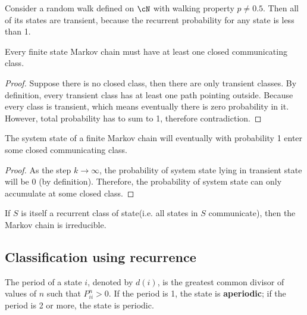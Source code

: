 \begin{refsection}
\begin{example}
Consider a random walk defined on $\cN$ with walking property $p\neq 0.5$. Then all of its states are transient, because the recurrent probability for any state is less than 1.\cite[70]{privault2013understanding} 
\end{example}


\begin{lemma}\cite[237]{luenberger1979introduction}
Every finite state Markov chain must have at least one closed communicating class.
\end{lemma}
\begin{proof}
Suppose there is no closed class, then there are only transient classes. By definition, every transient class has at least one path pointing outside. Because every class is transient, which means eventually there is zero probability in it. However, total probability has to sum to 1, therefore contradiction. 
\end{proof}



\begin{lemma}\cite[237]{luenberger1979introduction}
The system state of a finite Markov chain will eventually with probability 1 enter some closed communicating class.
\end{lemma}
\begin{proof}
As the step $k \to \infty$, the probability of system state lying in transient state will be 0 (by definition). Therefore, the probability of system state can only accumulate at some closed class.
\end{proof}


\begin{definition}
[irreducible] If $S$ is itself a recurrent class of state(i.e. all states in $S$ communicate), then the Markov chain is irreducible.
\end{definition}


\subsection{Classification using recurrence}
\begin{definition}\cite[165]{gallager2013stochastic}\cite[125]{privault2013understanding}
	The period of a state $i$, denoted by $d(i)$, is the greatest common divisor of values of $n$ such that $P^n_{ii} > 0$. If the period is 1, the state is \textbf{aperiodic}; if the period is 2 or more, the state is periodic. 
\end{definition}


\end{refsection}
